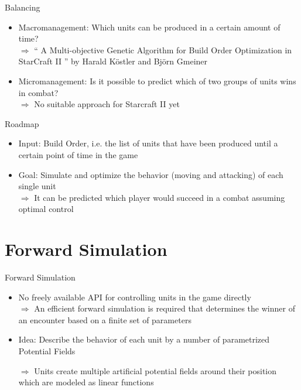\documentclass{beamer}
\begin{document}
\begin{frame}{Balancing}
\begin{itemize}
\item \alert{Macromanagement:} Which units can be produced in a certain amount of time?
\\ $\Rightarrow$ `` A Multi-objective Genetic Algorithm for Build Order Optimization in StarCraft II '' by Harald Köstler and Björn Gmeiner
\item \alert{Micromanagement:} Is it possible to predict which of two groups of units wins in combat?
\\ $\Rightarrow$ No suitable approach for Starcraft II yet
\end{itemize}
\end{frame}

\begin{frame}{Roadmap}
\begin{itemize}
\item \alert{Input:} Build Order, i.e. the list of units that have been produced until a certain point of time in the game
\item \alert{Goal:} Simulate and optimize the behavior (moving and attacking) of each single unit
\\ $\Rightarrow$ It can be predicted which player would succeed in a combat assuming optimal control
\end{itemize}
\end{frame}

\section{Forward Simulation}
\begin{frame}{Forward Simulation}
    \begin{itemize}
\item No freely available API for controlling units in the game directly
\\ $\Rightarrow$ An efficient forward simulation is required that determines the winner of an encounter based on a finite set of parameters
\item \alert{Idea:} Describe the behavior of each unit by a number of parametrized \alert{Potential Fields}
\item[$\Rightarrow$] Units create multiple artificial potential fields around their position which are modeled as linear functions
\end{itemize}
\end{frame}
\end{document}
